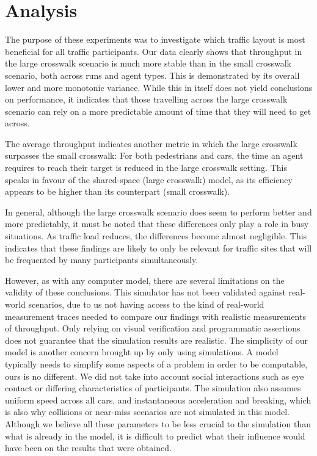 \chapter{Analysis} \label{chap:analysis}

The purpose of these experiments was to investigate which traffic layout is most beneficial for all traffic participants. Our data clearly shows that throughput in the large crosswalk scenario is much more stable than in the small crosswalk scenario, both across runs and agent types. This is demonstrated by its overall lower and more monotonic variance. While this in itself does not yield conclusions on performance, it indicates that those travelling across the large crosswalk scenario can rely on a more predictable amount of time that they will need to get across.

The average throughput indicates another metric in which the large crosswalk surpasses the small crosswalk: For both pedestrians and cars, the time an agent requires to reach their target is reduced in the large crosswalk setting. This speaks in favour of the shared-space (large crosswalk) model, as its efficiency appears to be higher than its counterpart (small crosswalk).

In general, although the large crosswalk scenario does seem to perform better and more predictably, it must be noted that these differences only play a role in busy situations. As traffic load reduces, the differences become almost negligible. This indicates that these findings are likely to only be relevant for traffic sites that will be frequented by many participants simultaneously.

However, as with any computer model, there are several limitations on the validity of these conclusions. This simulator has not been validated against real-world scenarios, due to us not having access to the kind of real-world measurement traces needed to compare our findings with realistic measurements of throughput. Only relying on visual verification and programmatic assertions does not guarantee that the simulation results are realistic. The simplicity of our model is another concern brought up by only using simulations. A model typically needs to simplify some aspects of a problem in order to be computable, ours is no different. We did not take into account social interactions such as eye contact or differing characteristics of participants. The simulation also assumes uniform speed across all cars, and instantaneous acceleration and breaking, which is also why collisions or near-miss scenarios are not simulated in this model. Although we believe all these parameters to be less crucial to the simulation than what is already in the model, it is difficult to predict what their influence would have been on the results that were obtained.
